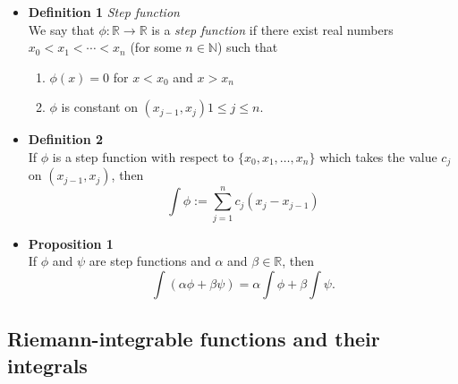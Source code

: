 \documentclass[11pt,a4paper]{article}
\begin{document}
\begin{itemize}
    \item \textbf{Definition 1} \emph{Step function} \\
        We say that $\phi : \mathbb{R} \to \mathbb{R}$ is a \emph{step function} if there
        exist real numbers $x_0 < x_1 < \cdots < x_n$ (for some $n \in \mathbb{N}$) such that
        \begin{enumerate}
            \item $\phi(x) = 0$ for $x < x_0$ and $x > x_n$
            \item $\phi$ is constant on $(x_{j-1}, x_j) 1 \leq j \leq n$.
        \end{enumerate}

    \item \textbf{Definition 2} \\
        If $\phi$ is a step function with respect to $\{x_0, x_1, \ldots, x_n\}$
        which takes the value $c_j$ on $(x_{j-1}, x_j)$, then
        \[
            \int \phi := \sum_{j=1}^n c_j (x_j - x_{j-1})
        \]

    \item \textbf{Proposition 1} \\
        If $\phi$ and $\psi$ are step functions and $\alpha$ and $\beta \in \mathbb{R}$, then
        \[
            \int(\alpha \phi + \beta \psi) = \alpha \int \phi + \beta \int \psi.
        \]

\end{itemize}

\subsection{Riemann-integrable functions and their integrals}
\end{document}
